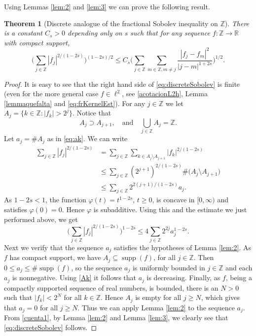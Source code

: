 \documentclass[a4paper,11pt,reqno]{amsart}
\newcommand{\R}{\mathbb{R}}
\newcommand{\Z}{\mathbb{Z}}
\newcommand{\supp}{\operatorname{supp}}
\newtheorem{thm}{Theorem}[section]
\theoremstyle{definition}
\numberwithin{equation}{section}
\begin{document}
Using Lemmas \ref{lem:2} and \ref{lem:3} we can prove the following result.

\begin{thm}[Discrete analogue of the fractional
Sobolev inequality on $\Z$]
There is a constant $C_s>0$ depending only on $s$ such that
for any sequence $f:\Z\to\R$ with compact support,
\begin{equation}
\label{eq:discreteSobolev}
\bigg(\sum_{j\in\Z}|f_j|^{2/(1-2s)}\bigg)^{(1-2s)/2}\leq
C_s\bigg(\sum_{j\in\Z}\sum_{m\in\Z,m\neq j}\frac{|f_j-f_m|^2}{|j-m|^{1+2s}}\bigg)^{1/2}.
\end{equation}
\end{thm}

\begin{proof}
It is easy to see that the right hand side of \eqref{eq:discreteSobolev} is finite
(even for the more general case $f\in\ell^2$, see \eqref{acotacionL2h}, Lemma \ref{lemmaquefalta}
and \eqref{eq:frKernelEst}).
For any $j\in\Z$ we let
$A_j=\{k\in\Z:|f_k|>2^j\}$.
Notice that
\begin{equation}
\label{Ak}
A_j\supset A_{j+1},\quad\text{and}\quad\bigcup_{j\in\Z}A_j=\Z.
\end{equation}
Let $a_j=\#A_j$ as in \eqref{eq:ak}. We can write
\begin{align*}
\sum_{j\in\Z}|f_j|^{2/(1-2s)} &=\sum_{j\in\Z}\sum_{k\in A_j\setminus A_{j+1}}|f_k|^{2/(1-2s)} \\
&\leq \sum_{j\in\Z}(2^{j+1})^{2/(1-2s)}\#\big(A_j\setminus A_{j+1}\big) \\
&\leq \sum_{j\in\Z}2^{2(j+1)/(1-2s)}a_j.
\end{align*}
As $1-2s<1$, the function $\varphi(t)=t^{1-2s}$, $t\geq0$, is concave in $[0,\infty)$ and
satisfies $\varphi(0)=0$. Hence $\varphi$ is subadditive.
Using this and the estimate we just performed above, we get
\begin{equation}
\label{cuenta1}
\bigg(\sum_{j\in\Z}|f_j|^{2/(1-2s)}\bigg)^{1-2s}\leq 4\sum_{j\in\Z}2^{2j}a_j^{1-2s}.
\end{equation}
Next we verify that the sequence $a_j$ satisfies the hypotheses of Lemma \ref{lem:2}.
As $f$ has compact support, we have $A_j\subseteq\supp(f)$, for all $j\in\Z$. Then
$0\leq a_j\leq\#\supp(f)$,
so the sequence $a_j$ is uniformly bounded in $j\in\Z$ and each $a_j$ is nonnegative.
Using \eqref{Ak} it follows that $a_j$ is decreasing.
Finally, as $f$, being a compactly supported sequence of real numbers, is bounded,
there is an $N>0$ such that $|f_k|<2^N$ for all $k\in\Z$. Hence $A_j$ is empty for all $j\geq N$,
which gives that $a_j=0$ for all $j\geq N$. Thus we can apply Lemma \ref{lem:2} to the sequence $a_j$.
From \eqref{cuenta1}, by Lemma \ref{lem:2} and Lemma \ref{lem:3}, we clearly see that
\eqref{eq:discreteSobolev} follows.
\end{proof}
\end{document}
